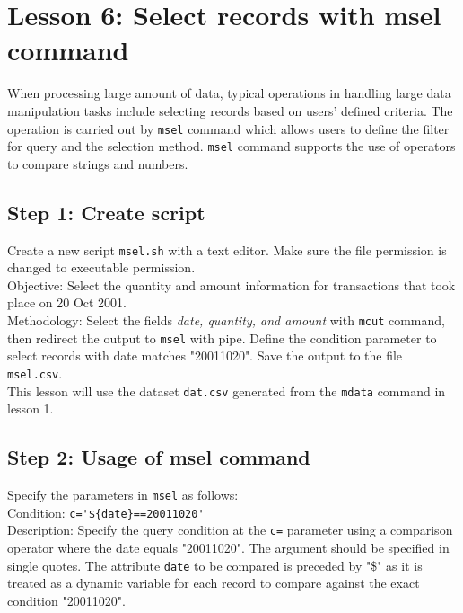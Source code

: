 

%


\section{Lesson 6: Select records with msel command}

When processing large amount of data, typical operations in handling large data manipulation tasks include selecting records based on users' defined criteria. The operation is carried out by \verb|msel| command which allows users to define the filter for query and the selection method. \verb|msel| command supports the use of operators to compare strings and numbers. 


\subsection{Step 1: Create script}

Create a new script \verb|msel.sh| with a text editor. Make sure the file permission is changed to executable permission. \\

Objective: Select the quantity and amount information for transactions that took place on 20 Oct 2001.    \\

Methodology: Select the fields \emph{date, quantity, and amount} with \verb|mcut| command, then redirect the output to \verb|msel| with pipe. Define the condition parameter to select records with date matches "20011020". Save the output to the file \verb|msel.csv|. \\

This lesson will use the dataset \verb|dat.csv| generated from the \verb|mdata| command in lesson 1. 

 \subsection{Step 2: Usage of msel command }


{\setlength{\parindent}{0cm}
Specify the parameters in \verb|msel| as follows: \\

Condition:		\verb|c='${date}==20011020'| \\
Description: 	Specify the query condition at the \verb|c=| parameter using a comparison operator where the date equals "20011020". The argument should be specified in single quotes. The attribute \verb|date| to be compared is preceded by "\$" as it is treated as a dynamic variable for each record to compare against the exact condition "20011020".\\
}

